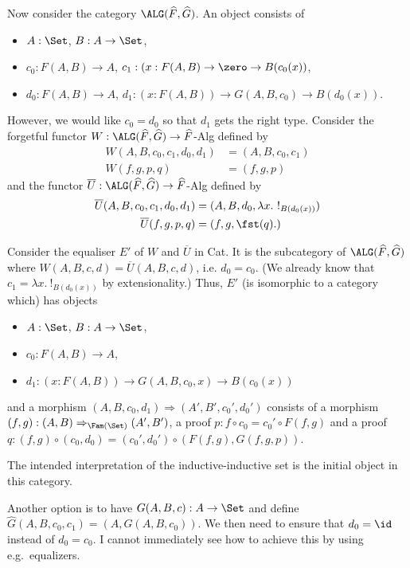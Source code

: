 \documentclass{article}
\begin{document}
Now consider the category $\ALG(\widehat{F}, \widehat{G})$. An object consists of
\begin{itemize}
\item $A : \Set$, $B : A \to \Set$,
\item $c_0 : F(A, B) \to A$, $c_1 : (x : F(A, B) \to \zero \to B(c_0(x))$,
\item $d_0 : F(A, B) \to A$, $d_1 : (x : F(A, B)) \to G(A, B, c_0) \to B(d_0(x))$.
\end{itemize}
However, we would like $c_0 = d_0$ so that $d_1$ gets the right
type. Consider the forgetful functor $W : \ALG(\widehat{F}, \widehat{G}) \to \widehat{F}$-Alg defined by
\begin{align*}
  W(A, B, c_0, c_1, d_0, d_1) &= (A, B, c_0, c_1) \\
  W(f, g, p, q)    &= (f, g, p)
\end{align*}
and the functor $\overline{U} : \ALG(\widehat{F}, \widehat{G}) \to \widehat{F}$-Alg defined by
\begin{align*}
  \overline{U}(A, B, c_0, c_1, d_0, d_1) &= (A, B, d_0, \lambda x.\ !_{B(d_0(x))}) \\
  \overline{U}(f, g, p, q)    &= (f, g, \fst(q).)
\end{align*}

Consider the equaliser $E'$ of $W$ and $\overline{U}$ in Cat. It is
the subcategory of $\ALG(\widehat{F}, \widehat{G})$ where $W(A, B, c,
d) = \overline{U}(A, B, c, d)$, i.e. $d_0 = c_0$. (We already know
that $c_1 = \lambda x.\ !_{B(d_0(x))}$ by extensionality.) Thus, $E'$
(is isomorphic to a category which) has objects
\begin{itemize}
\item $A : \Set$, $B : A \to \Set$,
\item $c_0 : F(A, B) \to A$,
\item $d_1 : (x : F(A, B)) \to G(A, B, c_0, x) \to B(c_0(x))$
\end{itemize}
and a morphism $(A, B, c_0, d_1) \Rightarrow (A', B', c_0', d_0')$
consists of a morphism $(f, g) : (A, B) \Rightarrow_{\Fam(\Set)} (A', B')$, a proof $p : f
\circ c_0 = c_0' \circ F(f, g)$ and a proof $q : (f, g) \circ (c_0,
d_0) = (c_0', d_0') \circ (F(f,g), G(f, g, p))$.

The intended interpretation of the inductive-inductive set is the
initial object in this category.

\begin{remark}
  Another option is to have $G(A, B, c) : A \to \Set$ and define
  $\widehat{G}(A, B, c_0, c_1) = (A, G(A, B, c_0))$. We then need to
  ensure that $d_0 = \id$ instead of $d_0 = c_0$. I cannot immediately
  see how to achieve this by using e.g.\ equalizers.
\end{remark}
\end{document}
